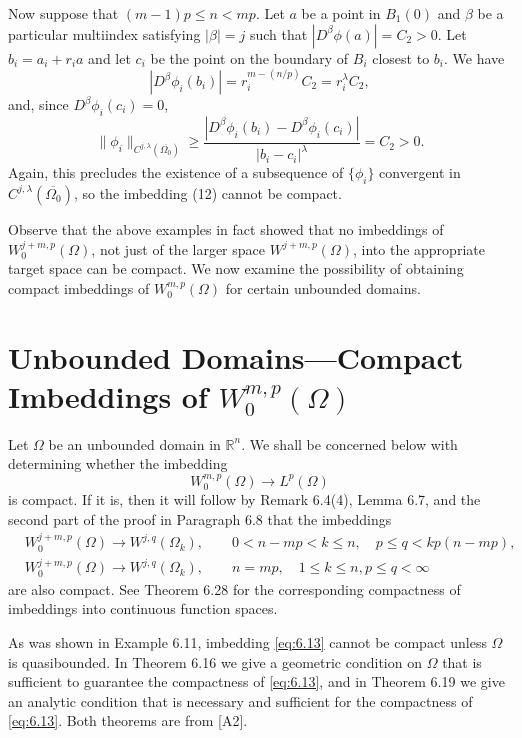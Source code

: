\begin{example}
  Now suppose that $(m-1)p\leq n<mp$. Let $a$ be a point in $B_1(0)$
  and $\beta$ be a particular multiindex satisfying $|\beta|=j$
  such that $|D^\beta\phi(a)|=C_2>0$.
  Let $b_i = a_i+r_ia$ and let $c_i$ be the point on the boundary of $B_i$ closest
  to $b_i$. We have
  \[|D^\beta\phi_i(b_i)| = r_i^{m-(n/p)} C_2 = r_i^\lambda C_2,\]
  and, since $D^\beta\phi_i(c_i) = 0$,
  \[\|\phi_i\|_{C^{j,\lambda}(\overline{\Omega_0})}
    \geq \frac{|D^\beta\phi_i(b_i) - D^\beta\phi_i(c_i)|}{|b_i-c_i|^\lambda} = C_2 > 0.\]
  Again, this precludes the existence of a subsequence of $\{\phi_i\}$
  convergent in $C^{j,\lambda}(\overline{\Omega_0})$, so the imbedding (12)
  cannot be compact.
\end{example}


\begin{remark}
  Observe that the above examples in fact showed that no imbeddings of $W_0^{j+m,p}(\Omega)$,
  not just of the larger space $W^{j+m,p}(\Omega)$, into the appropriate target space
  can be compact. We now examine the possibility of obtaining compact imbeddings of $W_0^{m,p}(\Omega)$
  for certain unbounded domains.
\end{remark}


\section{Unbounded Domains---Compact Imbeddings of $W_0^{m,p}(\Omega)$}

\begin{para}
  Let $\Omega$ be an unbounded domain in $\mathbb{R}^n$. We shall be concerned
  below with determining whether the imbedding
  \begin{equation}\label{eq:6.13}
    W_0^{m,p}(\Omega) \to L^p(\Omega)
  \end{equation}
  is compact. If it is, then it will follow by Remark 6.4(4), Lemma 6.7,
  and the second part of the proof in Paragraph 6.8 that the imbeddings
  \begin{align*}
    & W_0^{j+m,p}(\Omega) \to W^{j,q}(\Omega_k), \qquad
      0< n-mp < k \leq n, \quad p\leq q < kp(n-mp), \\
    & W_0^{j+m,p}(\Omega) \to W^{j,q}(\Omega_k), \qquad
      n = mp, \quad 1\leq k\leq n, p \leq q < \infty
  \end{align*}
  are also compact. See Theorem 6.28 for the corresponding compactness of imbeddings
  into continuous function spaces.

  As was shown in Example 6.11, imbedding \eqref{eq:6.13} cannot be compact unless
  $\Omega$ is quasibounded. In Theorem 6.16 we give a geometric condition on $\Omega$
  that is sufficient to guarantee the compactness of \eqref{eq:6.13},
  and in Theorem 6.19 we give an analytic condition that is necessary and sufficient
  for the compactness of \eqref{eq:6.13}. Both theorems are from [A2].
\end{para}


